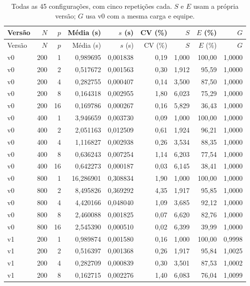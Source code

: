 \begin{longtable}{lrrrrrrrr}
\caption{Todas as 45 configurações, com cinco repetições cada. $S$ e $E$ usam a própria versão; $G$ usa v0 com a mesma carga e equipe.}\label{tab:completo}\\
\toprule Versão & $N$ & $p$ & Média (s) & $s$ (s) & CV (\%) & $S$ & $E$ (\%) & $G$\\
\midrule\endfirsthead
\toprule Versão & $N$ & $p$ & Média (s) & $s$ (s) & CV (\%) & $S$ & $E$ (\%) & $G$\\
\midrule\endhead
\bottomrule\endfoot
v0 & 200 & 1 & 0,989695 & 0,001838 & 0,19 & 1,000 & 100,00 & 1,0000\\
v0 & 200 & 2 & 0,517672 & 0,001563 & 0,30 & 1,912 & 95,59 & 1,0000\\
v0 & 200 & 4 & 0,282755 & 0,000407 & 0,14 & 3,500 & 87,50 & 1,0000\\
v0 & 200 & 8 & 0,164318 & 0,002955 & 1,80 & 6,023 & 75,29 & 1,0000\\
v0 & 200 & 16 & 0,169786 & 0,000267 & 0,16 & 5,829 & 36,43 & 1,0000\\
v0 & 400 & 1 & 3,946659 & 0,003730 & 0,09 & 1,000 & 100,00 & 1,0000\\
v0 & 400 & 2 & 2,051163 & 0,012509 & 0,61 & 1,924 & 96,21 & 1,0000\\
v0 & 400 & 4 & 1,116827 & 0,002938 & 0,26 & 3,534 & 88,35 & 1,0000\\
v0 & 400 & 8 & 0,636243 & 0,007254 & 1,14 & 6,203 & 77,54 & 1,0000\\
v0 & 400 & 16 & 0,642273 & 0,000187 & 0,03 & 6,145 & 38,41 & 1,0000\\
v0 & 800 & 1 & 16,286901 & 0,308834 & 1,90 & 1,000 & 100,00 & 1,0000\\
v0 & 800 & 2 & 8,495826 & 0,369292 & 4,35 & 1,917 & 95,85 & 1,0000\\
v0 & 800 & 4 & 4,420166 & 0,048040 & 1,09 & 3,685 & 92,12 & 1,0000\\
v0 & 800 & 8 & 2,460088 & 0,001825 & 0,07 & 6,620 & 82,76 & 1,0000\\
v0 & 800 & 16 & 2,545390 & 0,000510 & 0,02 & 6,399 & 39,99 & 1,0000\\
v1 & 200 & 1 & 0,989874 & 0,001580 & 0,16 & 1,000 & 100,00 & 0,9998\\
v1 & 200 & 2 & 0,516397 & 0,001368 & 0,26 & 1,917 & 95,84 & 1,0025\\
v1 & 200 & 4 & 0,282709 & 0,000839 & 0,30 & 3,501 & 87,53 & 1,0002\\
v1 & 200 & 8 & 0,162715 & 0,002276 & 1,40 & 6,083 & 76,04 & 1,0099\\

\end{longtable}

